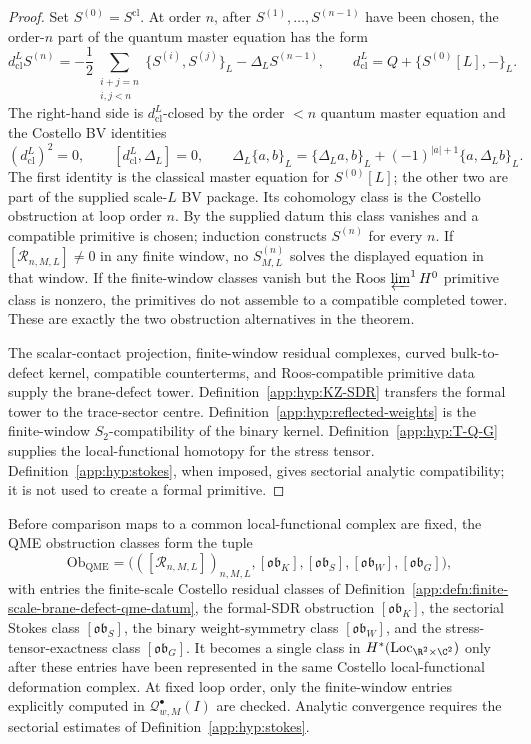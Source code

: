 \begin{proof}
Set \(S^{(0)}=S^{\mathrm{cl}}\).  At order \(n\), after
\(S^{(1)},\ldots,S^{(n-1)}\) have been chosen, the
order-\(n\) part of the quantum master equation has the form
\[
  d_{\mathrm{cl}}^L S^{(n)}
  =-\frac12\sum_{\substack{i+j=n\\ i,j<n}}\{S^{(i)},S^{(j)}\}_L
   -\Delta_L S^{(n-1)},\qquad
  d_{\mathrm{cl}}^L=Q+\{S^{(0)}[L],-\}_L .
\]
The right-hand side is \(d_{\mathrm{cl}}^L\)-closed by the order
\(<n\) quantum master equation and the Costello BV identities
\[
  (d_{\mathrm{cl}}^L)^2=0,\qquad
  [d_{\mathrm{cl}}^L,\Delta_L]=0,\qquad
  \Delta_L\{a,b\}_L
   =\{\Delta_La,b\}_L
    +(-1)^{|a|+1}\{a,\Delta_Lb\}_L .
\]
The first identity is the classical master equation for \(S^{(0)}[L]\);
the other two are part of the supplied scale-\(L\) BV package.  Its
cohomology class is the Costello obstruction at loop order \(n\).  By
the supplied datum this class vanishes and a compatible primitive is
chosen; induction constructs \(S^{(n)}\) for every \(n\).
If \([\mathcal R_{n,M,L}]\neq0\) in any finite window, no
\(S^{(n)}_{M,L}\) solves the displayed equation in that window.  If the
finite-window classes vanish but the Roos \(\varprojlim^1H^0\) primitive
class is nonzero, the primitives do not assemble to a compatible
completed tower.  These are exactly the two obstruction alternatives in
the theorem.

The scalar-contact projection, finite-window residual complexes, curved
bulk-to-defect kernel, compatible counterterms, and Roos-compatible
primitive data supply the brane-defect tower.
Definition~\ref{app:hyp:KZ-SDR} transfers the formal tower to the
trace-sector centre.  Definition~\ref{app:hyp:reflected-weights} is the
finite-window \(S_2\)-compatibility of the binary kernel.
Definition~\ref{app:hyp:T-Q-G} supplies the local-functional homotopy for
the stress tensor.  Definition~\ref{app:hyp:stokes}, when imposed, gives
sectorial analytic compatibility; it is not used to create a formal
primitive.
\end{proof}

\begin{rmk}\label{app:rmk:qme-obstruction}
Before comparison maps to a common local-functional complex are fixed, the
QME obstruction classes form the tuple
\[
  \mathrm{Ob}_{\mathrm{QME}}
   =
   \bigl(
   ([\mathcal R_{n,M,L}])_{n,M,L},
   [\mathfrak{ob}_K],[\mathfrak{ob}_S],
   [\mathfrak{ob}_W],[\mathfrak{ob}_G]\bigr),
\]
with entries the finite-scale Costello residual classes of
Definition~\ref{app:defn:finite-scale-brane-defect-qme-datum}, the
formal-SDR obstruction \( [\mathfrak{ob}_K]\), the sectorial Stokes class
\( [\mathfrak{ob}_S]\), the binary weight-symmetry class
\( [\mathfrak{ob}_W]\), and the stress-tensor-exactness class
\( [\mathfrak{ob}_G]\).  It becomes a single class in
\(H^*(\mathrm{Loc}_{\R^2\times\C^2})\) only after these entries have been
represented in the same Costello local-functional deformation complex.
At fixed loop order, only the finite-window entries explicitly computed
in \(\mathcal Q^\bullet_{w,M}(I)\) are checked.  Analytic convergence
requires the sectorial estimates of Definition~\ref{app:hyp:stokes}.
\end{rmk}

